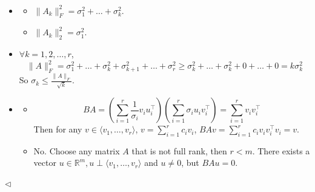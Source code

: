 \documentclass[11pt]{article}
\newenvironment{answer}[1][Answer]{\begin{trivlist}
\item[\hskip \labelsep {\bfseries #1.}\hskip \labelsep]}{\hfill$\lhd$\end{trivlist}}
\begin{document}
\begin{answer} ~
    \begin{itemize}
        \item[(1)]
        \begin{itemize}
            \item[(a)] $\|A_k\|_F^2 = \sigma_1^2 + \dots + \sigma_k^2$.
            \item[(b)] $\|A_k\|_2^2 = \sigma_1^2$.
        \end{itemize}
        \item[(2)] $\forall k = 1, 2, \dots, r$, 
            \[\|A\|_F^2 = \sigma_1^2 + \dots + \sigma_k^2 + \sigma_{k+1}^2 + \dots + \sigma_r^2 \ge \sigma_k^2 + \dots + \sigma_k^2 + 0 + \dots + 0 = k\sigma_k^2\]
            So $\sigma_k \le \frac{\|A\|_F}{\sqrt{k}}$.
        \item[(3)]
        \begin{itemize}
            \item[(a)] \[BA = \left(\sum_{i=1}^r \frac{1}{\sigma_i} v_i u_i^\top \right) \left(\sum_{i=1}^r \sigma_i u_i v_i^\top \right) = \sum_{i=1}^r v_i v_i^\top\]
            Then for any $v \in \langle v_1, \dots, v_r \rangle$, $v = \sum_{i=1}^r c_i v_i$, $BAv = \sum_{i=1}^r c_i v_i v_i^\top v_i = v$.
            \item[(b)] No. Choose any matrix $A$ that is not full rank, then $r < m$. There exists a vector $u \in \mathbb{R}^m, u \perp \langle v_1, \dots, v_r \rangle$ and $u \neq 0$, but $BAu = 0$.
        \end{itemize}
    \end{itemize}
\end{answer}
\end{document}
